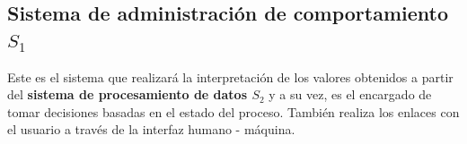 \subsection{Sistema de administración de comportamiento $S_1$}

Este es el sistema que realizará la interpretación de los valores obtenidos a partir del \textbf{sistema de procesamiento de datos $S_2$} y a su vez, es el encargado de tomar decisiones basadas en el estado del proceso. También realiza los enlaces con el usuario a través de la interfaz humano - máquina. 



